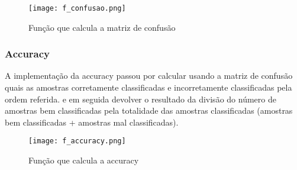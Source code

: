 \begin{figure}[H]

  \centering
  \captionsetup{justification=centering}

  \texttt{[image: f\_confusao.png]}
  
  \caption {Função que calcula a matriz de confusão}
\end{figure}


\subsubsection{Accuracy}\hfill\newline
\hfill\newline

A implementação da accuracy passou por calcular usando a matriz de confusão quais as amostras corretamente classificadas e incorretamente classificadas pela ordem referida. e em seguida devolver o resultado da divisão do número de amostras bem classificadas pela totalidade das amostras classificadas (amostras bem classificadas + amostras mal classificadas).

\begin{figure}[H]

  \centering
  \captionsetup{justification=centering}

  \texttt{[image: f\_accuracy.png]}
  
  \caption {Função que calcula a accuracy}
\end{figure}






























